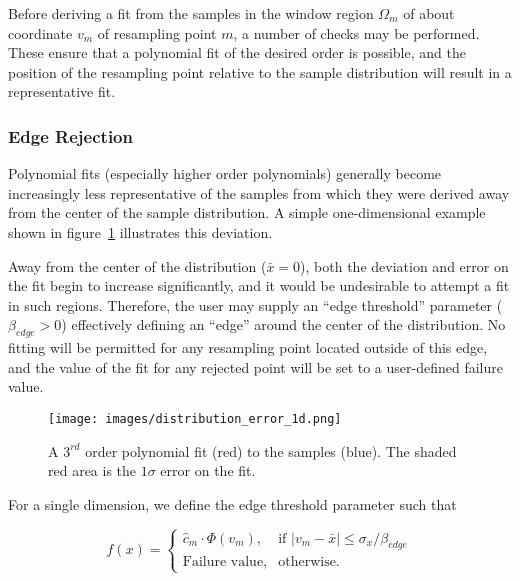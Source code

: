 Before deriving a fit from the samples in the window region $\Omega_m$ of
about coordinate $v_m$ of resampling point $m$, a number of checks may be
performed.
These ensure that a polynomial fit of the desired order is possible, and the
position of the resampling point relative to the sample distribution will
result in a representative fit.

\subsubsection{Edge Rejection}\label{subsubsec:edge-rejection}

Polynomial fits (especially higher order polynomials) generally become
increasingly less representative of the samples from which they were derived
away from the center of the sample distribution.
A simple one-dimensional example shown in figure~\ref{fig:distribution_error_1d}
illustrates this deviation.

Away from the center of the distribution ($\bar{x} = 0$), both the deviation
and error on the fit begin to increase significantly, and it would be
undesirable to attempt a fit in such regions.
Therefore, the user may supply an ``edge threshold'' parameter
($\beta_{edge} > 0$) effectively defining an ``edge'' around the center of the
distribution.
No fitting will be permitted for any resampling point located outside of this
edge, and the value of the fit for any rejected point will be set to a
user-defined failure value.

\begin{figure}[H]
  \begin{center}
  \texttt{[image: images/distribution\_error\_1d.png]}
  \caption{A $3^{rd}$ order polynomial fit (red) to the samples (blue).  The
           shaded red area is the $1\sigma$ error on the fit.}
  \label{fig:distribution_error_1d}
  \end{center}
\end{figure}

For a single dimension, we define the edge threshold parameter such that

\begin{equation}
    f(x)=\begin{cases}
        \hat{c}_m \cdot \Phi(v_m), & \textrm{if }
             | v_m - \bar{x} | \leq \sigma_x / \beta_{edge} \\
         \textrm{Failure value}, & \textrm{otherwise.}
    \end{cases}
    \label{eq:equation15}
\end{equation}

